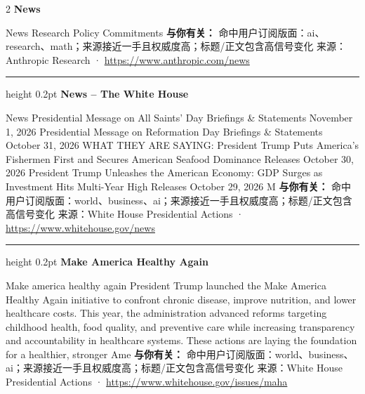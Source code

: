 \documentclass[10.5pt]{ctexart}
\begin{document}
\begin{multicols}{2}
{\large\bfseries News}\par
News Research Policy Commitments
\textbf{与你有关：} 命中用户订阅版面：ai、research、math；来源接近一手且权威度高；标题/正文包含高信号变化
{\footnotesize\color{ormuted} 来源：Anthropic Research · \url{https://www.anthropic.com/news}}
\vspace{2mm}
\hrule height 0.2pt
\vspace{2mm}
{\large\bfseries News – The White House}\par
News Presidential Message on All Saints’ Day Briefings \& Statements November 1, 2026 Presidential Message on Reformation Day Briefings \& Statements October 31, 2026 WHAT THEY ARE SAYING: President Trump Puts America’s Fishermen First and Secures American Seafood Dominance Releases October 30, 2026 President Trump Unleashes the American Economy: GDP Surges as Investment Hits Multi-Year High Releases October 29, 2026 M
\textbf{与你有关：} 命中用户订阅版面：world、business、ai；来源接近一手且权威度高；标题/正文包含高信号变化
{\footnotesize\color{ormuted} 来源：White House Presidential Actions · \url{https://www.whitehouse.gov/news}}
\vspace{2mm}
\hrule height 0.2pt
\vspace{2mm}
{\large\bfseries Make America Healthy Again}\par
Make america healthy again President Trump launched the Make America Healthy Again initiative to confront chronic disease, improve nutrition, and lower healthcare costs. This year, the administration advanced reforms targeting childhood health, food quality, and preventive care while increasing transparency and accountability in healthcare systems. These actions are laying the foundation for a healthier, stronger Ame
\textbf{与你有关：} 命中用户订阅版面：world、business、ai；来源接近一手且权威度高；标题/正文包含高信号变化
{\footnotesize\color{ormuted} 来源：White House Presidential Actions · \url{https://www.whitehouse.gov/issues/maha}}
\end{multicols}
\end{document}
